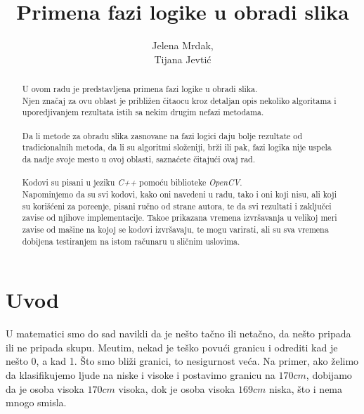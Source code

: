 \documentclass[12pt,a4paper]{article}
\title{Primena fazi logike u obradi slika}
\author{Jelena Mrdak,\\ Tijana Jevti\' c}
\theoremstyle{definition}
\theoremstyle{remark}
\theoremstyle{plain}
\begin{document}
\maketitle

\begin{abstract}
  U ovom radu je predstavljena primena fazi logike u obradi slika. \\
  Njen zna\v caj za ovu oblast je pribli\v zen \v citaocu kroz detaljan opis nekoliko algoritama i uporedjivanjem rezultata istih sa nekim drugim nefazi metodama.\\ \\
  Da li metode za obradu slika zasnovane na fazi logici daju bolje rezultate od tradicionalnih metoda, da li su algoritmi slo\v zeniji, br\v zi ili pak,
  fazi logika nije uspela da nadje svoje mesto u ovoj oblasti, sazna\' cete \v citaju\' ci ovaj rad. \\ \\
  Kodovi su pisani u jeziku \textit{C++} pomo\' cu biblioteke \textit{OpenCV}. \\
  Napominjemo da su svi kodovi, kako oni navedeni u radu, tako i oni koji nisu, ali koji su kori\v s\' ceni za pore\dj enje, pisani ru\v cno od strane autora, te da svi rezultati i zaklju\v cci zavise od njihove implementacije. Tako\dj e prikazana vremena izvr\v savanja u velikoj meri zavise od ma\v sine na kojoj se kodovi izvr\v savaju, te mogu varirati, ali su sva vremena dobijena testiranjem na istom ra\v cunaru u sli\v cnim uslovima.
\end{abstract}

\newpage
\tableofcontents

\newpage
\section{Uvod}
U matematici smo do sad navikli da je ne\v sto ta\v cno ili neta\v cno, da ne\v sto pripada ili ne pripada skupu. Me\dj utim, nekad je te\v sko povu\' ci granicu i odrediti kad je ne\v sto 0, a kad 1. \v Sto smo bli\v zi granici, to nesigurnost ve\' ca. Na primer, ako \v zelimo da klasifikujemo ljude na niske i visoke i postavimo granicu na $170 cm$, dobijamo da je osoba visoka $170 cm$ visoka, dok je osoba visoka $169 cm$ niska, \v sto i nema mnogo smisla.\\
\end{document}
